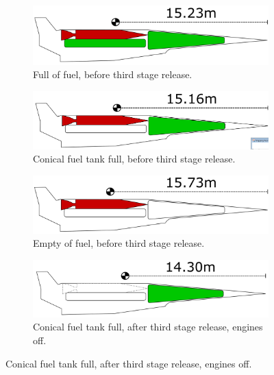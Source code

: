 		
		
		
		
		\begin{figure}
			\begin{subfigure}{.5\textwidth}
				\centering
				\includegraphics[width=0.9\linewidth]{figures/3_vehicle_design/CG1}
				\caption{Full of fuel, before third stage release.}
			\end{subfigure}
			\begin{subfigure}{.5\textwidth}
				\centering
				\includegraphics[width=0.9\linewidth]{figures/3_vehicle_design/CG2}
				\caption{Conical fuel tank full, before third stage release.}
				
			\end{subfigure}
			\begin{subfigure}{.5\textwidth}
				\centering
				\includegraphics[width=0.9\linewidth]{figures/3_vehicle_design/CG3}
				\caption{Empty of fuel, before third stage release.}
				
			\end{subfigure}
			\begin{subfigure}{.5\textwidth}
				\centering
				\includegraphics[width=0.9\linewidth]{figures/3_vehicle_design/CG4}
				\caption{Conical fuel tank full, after third stage release, engines off.}
				

\end{subfigure}
\end{figure}

